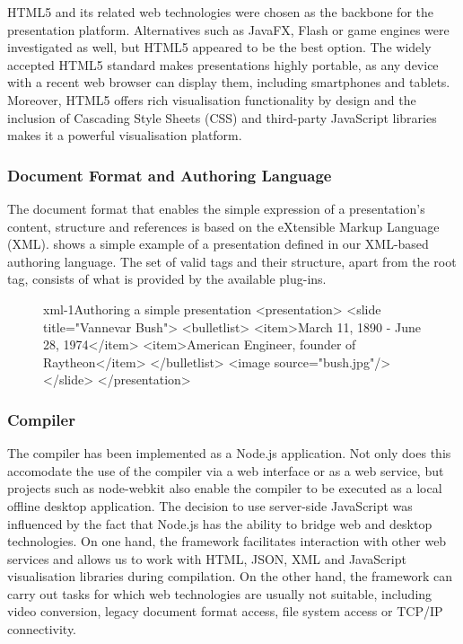     HTML5 and its related web technologies were chosen as the backbone for the
    \mxp presentation platform. Alternatives such as JavaFX, Flash or game
    engines were investigated as well, but HTML5 appeared to be the best
    option. The widely accepted HTML5 standard makes \mxp presentations highly
    portable, as any device with a recent web browser can display them,
    including smartphones and tablets. Moreover, HTML5 offers rich
    visualisation functionality by design and the inclusion of Cascading Style
    Sheets (CSS) and third-party JavaScript libraries makes it a powerful
    visualisation platform.

    \subsubsection{Document Format and Authoring Language}

     The \mxp document format that enables the simple expression of a
     presentation's content, structure and references is based on the
     eXtensible Markup Language (XML).  shows a simple example
     of a presentation defined in our XML-based authoring language. The set of
     valid tags and their structure, apart from the  root
     tag, consists of what is provided by the available plug-ins.

     \begin{figure}[h!]
      \begin{lstxml}{xml-1}{Authoring a simple \mxp presentation}
<presentation>
  <slide title="Vannevar Bush">
    <bulletlist>
      <item>March 11, 1890 - June 28, 1974</item>
      <item>American Engineer, founder of Raytheon</item>
    </bulletlist>
    <image source="bush.jpg"/>
  </slide>
</presentation>
      \end{lstxml}
     \end{figure}

    \subsubsection{Compiler}

     The compiler has been implemented as a Node.js application. Not only does
     this accomodate the use of the compiler via a web interface or as a web
     service, but projects such as node-webkit also enable the compiler to be
     executed as a local offline desktop application. The decision to use
     server-side JavaScript was influenced by the fact that Node.js has the
     ability to bridge web and desktop technologies. On one hand, the framework
     facilitates interaction with other web services and allows us to work with
     HTML, JSON, XML and JavaScript visualisation libraries during compilation.
     On the other hand, the framework can carry out tasks for which web
     technologies are usually not suitable, including video conversion, legacy
     document format access, file system access or TCP/IP connectivity.

